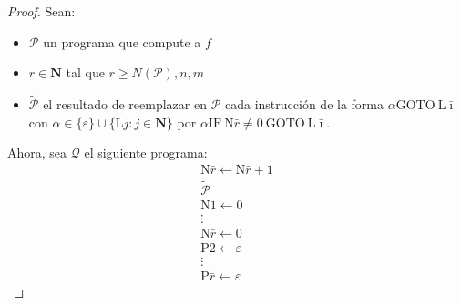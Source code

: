 \begin{frame}
  \begin{proof}
    \PN Sean:
    \begin{itemize}
      \item $\mathcal{P}$ un programa que compute a $f$
      \item $r \in \mathbf{N}$ tal que $r \geq N(\mathcal{P}), n, m$
      \item $\mathcal{\tilde{P}}$ el resultado de reemplazar en $\mathcal{P}$ cada instrucción de la forma $\alpha
      \mathrm{GOTO} \ \mathrm{L}\bar{\imath}$ con $\alpha \in \{\varepsilon\} \cup \{\mathrm{L}\bar{j}: j \in
      \mathbf{N}\}$ por $\alpha \mathrm{IF \ N}\bar{r} \neq 0 \ \mathrm{GOTO} \ \mathrm{L}\bar{\imath}$.
    \end{itemize}

    \PN Ahora, sea $\mathcal{Q}$ el siguiente programa:
    \begin{equation*}
      \begin{array}{l}
        \mathrm{N}\bar{r} \leftarrow \mathrm{N}\bar{r} + 1 \\
        \mathcal{\tilde{P}} \\
        \mathrm{N}1\leftarrow 0 \\
        \vdots \\
        \mathrm{N}\bar{r} \leftarrow 0 \\
        \mathrm{P}2 \leftarrow \varepsilon  \\
        \vdots \\
        \mathrm{P}\bar{r} \leftarrow \varepsilon
      \end{array}
    \end{equation*}
  \end{proof}
\end{frame}
